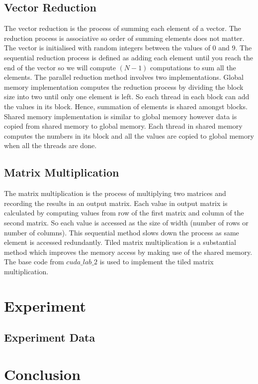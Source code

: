 \subsection{Vector Reduction}
The vector reduction is the process of summing each element of a vector. The reduction process is associative so order of summing elements does not matter. The vector is initialised with random integers between the values of 0 and 9. The sequential reduction process is defined as adding each element until you reach the end of the vector so we will compute $(N-1)$ computations to sum all the elements. The parallel reduction method involves two implementations. Global memory implementation computes the reduction process by dividing the block size into two until only one element is left. So each thread in each block can add the values in its block. Hence, summation of elements is shared amongst blocks. Shared memory implementation is similar to global memory however data is copied from shared memory to global memory. Each thread in shared memory computes the numbers in its block and all the values are copied to global memory when all the threads are done.

\subsection{Matrix Multiplication}
The matrix multiplication is the process of multiplying two matrices and recording the results in an output matrix. Each value in output matrix is calculated by computing values from row of the first matrix and column of the second matrix. So each value is accessed as the size of width (number of rows or number of columns). This sequential method slows down the process as same element is accessed redundantly. Tiled matrix multiplication is a substantial method which improves the memory access by making use of the shared memory.  The base code from $cuda\_lab\_2$ is used to implement the tiled matrix multiplication.


\section{Experiment} 



\subsection{Experiment Data}

\section{Conclusion} 


\newpage



 


